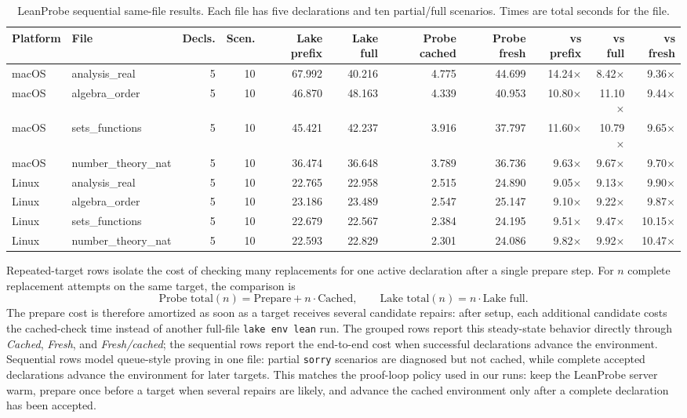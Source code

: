 \documentclass{article}
\begin{document}
\begin{table}[H]
\centering
\caption{LeanProbe sequential same-file results. Each file has five declarations and ten partial/full scenarios. Times are total seconds for the file.}
\label{tab:appendix-leanprobe-sequential}
\footnotesize
\setlength{\tabcolsep}{3pt}
\begin{tabular}{llrrrrrrrrr}
\toprule
Platform & File & Decls. & Scen. & Lake prefix & Lake full & Probe cached & Probe fresh & vs prefix & vs full & vs fresh \\
\midrule
macOS & analysis\_real & 5 & 10 & 67.992 & 40.216 & 4.775 & 44.699 & 14.24$\times$ & 8.42$\times$ & 9.36$\times$ \\
macOS & algebra\_order & 5 & 10 & 46.870 & 48.163 & 4.339 & 40.953 & 10.80$\times$ & 11.10$\times$ & 9.44$\times$ \\
macOS & sets\_functions & 5 & 10 & 45.421 & 42.237 & 3.916 & 37.797 & 11.60$\times$ & 10.79$\times$ & 9.65$\times$ \\
macOS & number\_theory\_nat & 5 & 10 & 36.474 & 36.648 & 3.789 & 36.736 & 9.63$\times$ & 9.67$\times$ & 9.70$\times$ \\
Linux & analysis\_real & 5 & 10 & 22.765 & 22.958 & 2.515 & 24.890 & 9.05$\times$ & 9.13$\times$ & 9.90$\times$ \\
Linux & algebra\_order & 5 & 10 & 23.186 & 23.489 & 2.547 & 25.147 & 9.10$\times$ & 9.22$\times$ & 9.87$\times$ \\
Linux & sets\_functions & 5 & 10 & 22.679 & 22.567 & 2.384 & 24.195 & 9.51$\times$ & 9.47$\times$ & 10.15$\times$ \\
Linux & number\_theory\_nat & 5 & 10 & 22.593 & 22.829 & 2.301 & 24.086 & 9.82$\times$ & 9.92$\times$ & 10.47$\times$ \\
\bottomrule
\end{tabular}
\end{table}

Repeated-target rows isolate the cost of checking many replacements for one active declaration after a single prepare step.
For $n$ complete replacement attempts on the same target, the comparison is
\[
  \text{Probe total}(n)=\text{Prepare}+n\cdot\text{Cached},
  \qquad
  \text{Lake total}(n)=n\cdot\text{Lake full}.
\]
The prepare cost is therefore amortized as soon as a target receives several candidate repairs: after setup, each additional candidate costs the cached-check time instead of another full-file \texttt{lake env lean} run.
The grouped rows report this steady-state behavior directly through \emph{Cached}, \emph{Fresh}, and \emph{Fresh/cached}; the sequential rows report the end-to-end cost when successful declarations advance the environment.
Sequential rows model queue-style proving in one file: partial \texttt{sorry} scenarios are diagnosed but not cached, while complete accepted declarations advance the environment for later targets.
This matches the proof-loop policy used in our runs: keep the LeanProbe server warm, prepare once before a target when several repairs are likely, and advance the cached environment only after a complete declaration has been accepted.
\end{document}
